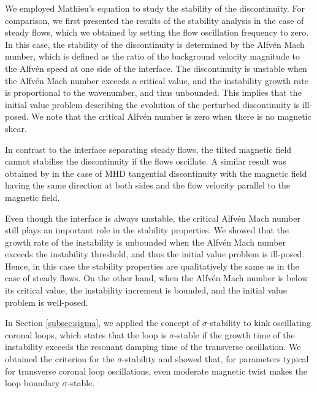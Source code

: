 \documentclass[12pt]{ociamthesis}
\begin{document}
We employed Mathieu's equation to study the stability of the discontinuity.
For comparison, we first presented the results of the stability analysis in the case of steady flows, which we obtained by setting the flow oscillation frequency to zero.
In this case, the stability of the discontinuity is determined by the Alfv\'en Mach number, which is defined as the ratio of the background velocity magnitude to the Alfv\'en speed at one side of the interface.
The discontinuity is unstable when the Alfv\'en Mach number exceeds a critical value, and the instability growth rate is proportional to the wavenumber, and thus unbounded.
This implies that the initial value problem describing the evolution of the perturbed discontinuity is ill-posed.
We note that the critical Alfv\'en number is zero when there is no magnetic shear. 

In contrast to the interface separating steady flows, the tilted magnetic field cannot stabilise the discontinuity if the flows oscillate. A similar result was obtained by \cite{Roberts1973} in the case of MHD tangential discontinuity with the magnetic field having the same direction at both sides and the flow velocity parallel to the magnetic field.

Even though the interface is always unstable, the critical Alfv\'en Mach number still plays an important role in the stability properties.
We showed that the growth rate of the instability is unbounded when the Alfv\'en Mach number exceeds the instability threshold, and thus the initial value problem is ill-posed.
Hence, in this case the stability properties are qualitatively the same as in the case of steady flows.
On the other hand, when the Alfv\'en Mach number is below its critical value, the instability increment is bounded, and the initial value problem is well-posed.

In Section \ref{subsec:sigma}, we applied the concept of $\sigma$-stability to kink oscillating coronal loops, which states that the loop is $\sigma$-stable if the growth time of the instability exceeds the resonant damping time of the transverse oscillation.
We obtained the criterion for the $\sigma$-stability and showed that, for parameters typical for transverse coronal loop oscillations, even moderate magnetic twist makes the loop boundary $\sigma$-stable.
\end{document}

